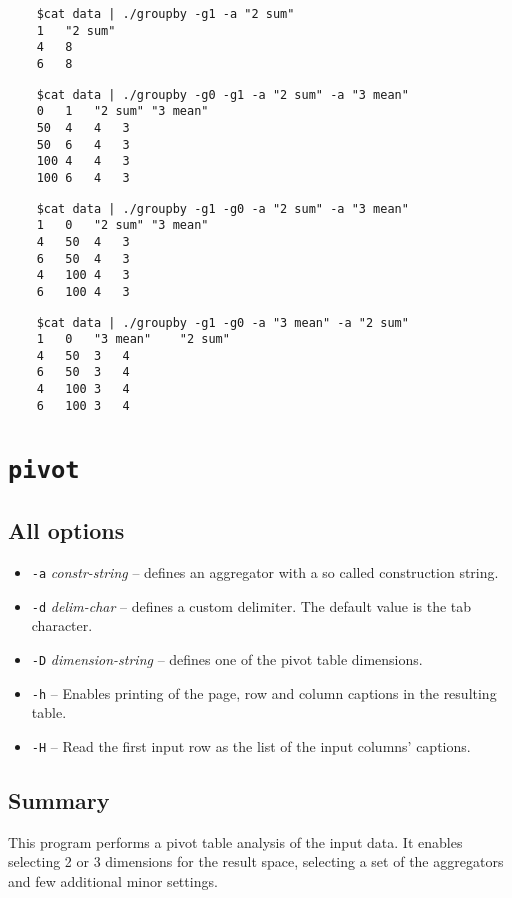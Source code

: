 \documentclass{report}
\begin{document}
	\begin{verbatim}
	$cat data | ./groupby -g1 -a "2 sum"
	1	"2 sum"
	4	8
	6	8
	\end{verbatim}

	\begin{verbatim}
	$cat data | ./groupby -g0 -g1 -a "2 sum" -a "3 mean"
	0	1	"2 sum"	"3 mean"
	50	4	4	3
	50	6	4	3
	100	4	4	3
	100	6	4	3
	\end{verbatim}

	\begin{verbatim}
	$cat data | ./groupby -g1 -g0 -a "2 sum" -a "3 mean"
	1	0	"2 sum"	"3 mean"
	4	50	4	3
	6	50	4	3
	4	100	4	3
	6	100	4	3
	\end{verbatim}

	\begin{verbatim}
	$cat data | ./groupby -g1 -g0 -a "3 mean" -a "2 sum"
	1	0	"3 mean"	"2 sum"
	4	50	3	4
	6	50	3	4
	4	100	3	4
	6	100	3	4
	\end{verbatim}

\section{\texttt{pivot}}

	\subsection{All options}
	\begin{itemize}
		\item \texttt{-a} \textit{constr-string} -- defines an aggregator with a
			so called construction string.
		\item \texttt{-d} \textit{delim-char} -- defines a custom delimiter.
			The default value is the tab character.
		\item \texttt{-D} \textit{dimension-string} -- defines one of the pivot
			table dimensions.
		\item \texttt{-h} -- Enables printing of the page, row and column
			captions in the resulting table.
		\item \texttt{-H} -- Read the first input row as the list of the input
			columns' captions.
	\end{itemize}

	\subsection{Summary}
	This program performs a pivot table analysis of the input data. It enables
	selecting 2 or 3 dimensions for the result space, selecting a set of the
	aggregators and few additional minor settings.
\end{document}
